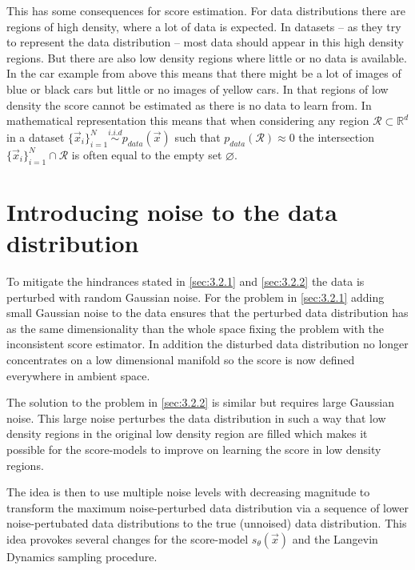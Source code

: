 This has some consequences for score estimation. For data distributions there are regions of high density, where a lot of data is expected. In datasets – as they try to represent the data distribution – most data should appear in this high density regions. But there are also low density regions where little or no data is available. In the car example from above this means that there might be a lot of images of blue or black cars but little or no images of yellow cars. In that regions of low density the score cannot be estimated as there is no data to learn from. In mathematical representation this means that when considering any region $\mathcal{R}\subset\mathbb{R}^d$ in a dataset $\{\vec{x}_i\}_{i=1}^N\overset{i.i.d}{\sim}p_{data}(\vec{x})$ such that $p_{data}(\mathcal{R})\approx0$ the intersection $\{\vec{x}_i\}_{i=1}^N\cap\mathcal{R}$ is often equal to the empty set $\varnothing$. 

\section[Introducing noise to the data distribution]{Introducing noise to the data distribution%
    } \label{sec:3.3}
To mitigate the hindrances stated in \cref{sec:3.2.1} and \cref{sec:3.2.2} the data is perturbed with random Gaussian noise. For the problem in \cref{sec:3.2.1} adding small Gaussian noise to the data ensures that the perturbed data distribution has as the same dimensionality than the whole space fixing the problem with the inconsistent score estimator. In addition the disturbed data distribution no longer concentrates on a low dimensional manifold so the score is now defined everywhere in ambient space.

The solution to the problem in \cref{sec:3.2.2} is similar but requires large Gaussian noise. This large noise perturbes the data distribution in such a way that low density regions in the original low density region are filled which makes it possible for the score-models to improve on learning the score in low density regions.

The idea is then to use multiple noise levels with decreasing magnitude to transform the maximum noise-perturbed data distribution via a sequence of lower noise-pertubated data distributions to the true (unnoised) data distribution. This idea provokes several changes for the score-model $s_\theta(\vec{x})$ and the Langevin Dynamics sampling procedure.
%
